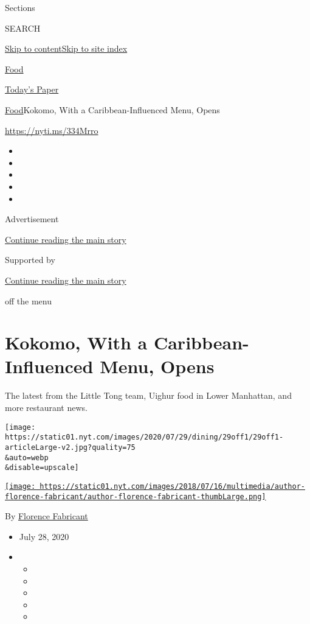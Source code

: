 Sections

SEARCH

\protect\hyperlink{site-content}{Skip to
content}\protect\hyperlink{site-index}{Skip to site index}

\href{https://www.nytimes.com/section/food}{Food}

\href{https://myaccount.nytimes.com/auth/login?response_type=cookie\&client_id=vi}{}

\href{https://www.nytimes.com/section/todayspaper}{Today's Paper}

\href{/section/food}{Food}\textbar{}Kokomo, With a Caribbean-Influenced
Menu, Opens

\url{https://nyti.ms/334Mrro}

\begin{itemize}
\item
\item
\item
\item
\item
\end{itemize}

Advertisement

\protect\hyperlink{after-top}{Continue reading the main story}

Supported by

\protect\hyperlink{after-sponsor}{Continue reading the main story}

off the menu

\hypertarget{kokomo-with-a-caribbean-influenced-menu-opens}{%
\section{Kokomo, With a Caribbean-Influenced Menu,
Opens}\label{kokomo-with-a-caribbean-influenced-menu-opens}}

The latest from the Little Tong team, Uighur food in Lower Manhattan,
and more restaurant news.

\texttt{[image: https://static01.nyt.com/images/2020/07/29/dining/29off1/29off1-articleLarge-v2.jpg?quality=75\\\&auto=webp\\\&disable=upscale]}

\href{https://www.nytimes.com/by/florence-fabricant}{\texttt{[image: https://static01.nyt.com/images/2018/07/16/multimedia/author-florence-fabricant/author-florence-fabricant-thumbLarge.png]}}

By \href{https://www.nytimes.com/by/florence-fabricant}{Florence
Fabricant}

\begin{itemize}
\item
  July 28, 2020
\item
  \begin{itemize}
  \item
  \item
  \item
  \item
  \item
  \end{itemize}
\end{itemize}

